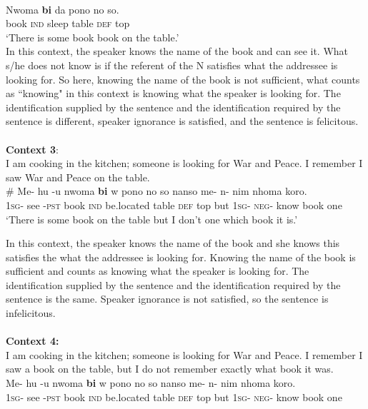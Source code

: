 \documentclass[output=paper,
modfonts
]{langsci/langscibook}
\begin{document}
\ea\label{ex62}\\
\gll Nwoma \textbf{bi} da pono no so.\\
	      book \textsc{ind}  sleep table \textsc{def} top\\

\glt `There is some book book on the table.'\\

 \z In this context, the speaker knows the name of the book and can see it. What s/he does not know is if the referent of the N satisfies what the addressee is looking for. So here, knowing the name of the book is not sufficient, what counts as ``knowing" in this context is knowing what the speaker is looking for.  The identification supplied by the sentence and the identification required by the sentence is different, speaker ignorance is satisfied, and the sentence is felicitous.\\\\
\textbf{Context 3}:\\
I am cooking in the kitchen; someone is looking for War and Peace. I remember I saw War and Peace on the table.
\ea\label{ex62}\\
\gll \# Me- hu -u nwoma \textbf{bi} w pono no so nanso me- n- nim nhoma koro.\\
	     {} \textsc{1sg}- see -\textsc{pst}  book \textsc{ind}  be.located table \textsc{def}  top but \textsc{1sg}- \textsc{neg}- know book one\\

\glt `There is some book on the table but I don't one which book it is.'

 \z In this context, the speaker knows the name of the book and she knows this satisfies the what the addressee is looking for. Knowing the name of the book is sufficient and counts as knowing what the speaker is looking for. The identification supplied by the sentence and the identification required by the sentence is the same. Speaker ignorance is not satisfied, so the sentence is infelicitous.  \\\\
\textbf{Context 4:} \\
I am cooking in the kitchen; someone is looking for War and Peace. I remember I saw a book on the table, but I do not remember exactly what book it was.
\ea\label{ex62}\\
\gll Me- hu -u nwoma \textbf{bi} w pono no so nanso me- n- nim nhoma koro.\\
	     \textsc{1sg}- see -\textsc{pst}  book \textsc{ind}  be.located table \textsc{def} top but \textsc{1sg}- \textsc{neg}- know book one\\
\end{document}
